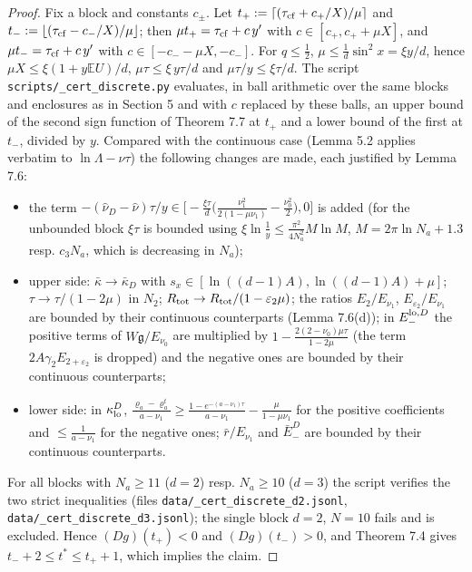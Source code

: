 \documentclass[11pt,a4paper]{article}
\theoremstyle{definition}
\theoremstyle{remark}
\begin{document}
\begin{proof}
Fix a block and constants $c_\pm$. Let $t_+:=\lceil(\tau_{\rm cf}+c_+/X)/\mu\rceil$ and $t_-:=\lfloor(\tau_{\rm cf}-c_-/X)/\mu\rfloor$; then $\mu t_+=\tau_{\rm cf}+c\,y'$ with $c\in[c_+,c_++\mu X]$, and $\mu t_-=\tau_{\rm cf}+c\,y'$ with $c\in[-c_--\mu X,-c_-]$. For $q\le\frac12$, $\mu\le\frac1d\sin^2x=\xi y/d$, hence $\mu X\le\xi(1+y\mathbb EU)/d$, $\mu\tau\le\xi\,y\tau/d$ and $\mu\tau/y\le\xi\tau/d$. The script \texttt{scripts/\_\allowbreak cert\_\allowbreak discrete.py} evaluates, in ball arithmetic over the same blocks and enclosures as in Section 5 and with $c$ replaced by these balls, an upper bound of the second sign function of Theorem 7.7 at $t_+$ and a lower bound of the first at $t_-$, divided by $y$. Compared with the continuous case (Lemma 5.2 applies verbatim to $\ln\Lambda-\hat\nu\tau$) the following changes are made, each justified by Lemma 7.6:

\begin{itemize}
\item the term $-(\hat\nu_D-\hat\nu)\tau/y\in\bigl[-\frac{\xi\tau}{d}\bigl(\frac{\nu_1^2}{2(1-\mu\nu_1)}-\frac{\nu_0^2}{2}\bigr),0\bigr]$ is added (for the unbounded block $\xi\tau$ is bounded using $\xi\ln\frac1y\le\frac{\pi^2}{4N_a^2}M\ln M$, $M=2\pi\ln N_a+1.3$ resp. $c_3N_a$, which is decreasing in $N_a$);
\item upper side: $\bar\kappa\to\bar\kappa_D$ with $s_x\in[\ln((d-1)A),\ln((d-1)A)+\mu]$; $\tau\to\tau/(1-2\mu)$ in $N_2$; $R_{\rm tot}\to R_{\rm tot}/(1-\varepsilon_2\mu)$; the ratios $E_2/E_{\nu_1}$, $E_{\varepsilon_2}/E_{\nu_1}$ are bounded by their continuous counterparts (Lemma 7.6(d)); in $E_-^{{\rm lo},D}$ the positive terms of $W\mathfrak g/E_{\nu_0}$ are multiplied by $1-\frac{2(2-\nu_0)\mu\tau}{1-2\mu}$ (the term $2A\gamma_2E_{2+\varepsilon_2}$ is dropped) and the negative ones are bounded by their continuous counterparts;
\item lower side: in $\kappa^D_{\rm lo}$, $\frac{\varrho_a-\varrho_a^t}{a-\nu_1}\ge\frac{1-e^{-(a-\nu_1)\tau}}{a-\nu_1}-\frac{\mu}{1-\mu\nu_1}$ for the positive coefficients and $\le\frac1{a-\nu_1}$ for the negative ones; $\bar r/E_{\nu_1}$ and $\bar E^D_-$ are bounded by their continuous counterparts.
\end{itemize}

For all blocks with $N_a\ge11$ ($d=2$) resp. $N_a\ge10$ ($d=3$) the script verifies the two strict inequalities (files \texttt{data/\_\allowbreak cert\_\allowbreak discrete\_\allowbreak d2.jsonl}, \texttt{data/\_\allowbreak cert\_\allowbreak discrete\_\allowbreak d3.jsonl}); the single block $d=2$, $N=10$ fails and is excluded. Hence $(Dg)(t_+)<0$ and $(Dg)(t_-)>0$, and Theorem 7.4 gives $t_-+2\le t^*\le t_++1$, which implies the claim.
\end{proof}
\end{document}
